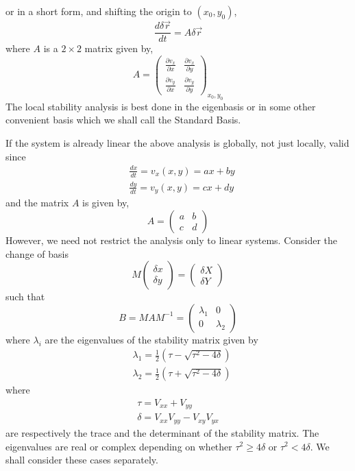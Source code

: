 or in a short form, and shifting the origin to $\left(x_{0}, y_{0}\right)$,
$$
\frac{d \delta \vec{r}}{d t}=A \delta \vec{r}
$$
where $A$ is a $2 \times 2$ matrix given by,
$$
A=\left(\begin{array}{ll}
\frac{\partial v_{x}}{\partial x} & \frac{\partial v_{x}}{\partial y} \\
\frac{\partial v_{y}}{\partial x} & \frac{\partial v_{y}}{\partial y}
\end{array}\right)_{x_{0}, y_{0}}
$$
The local stability analysis is best done in the eigenbasis or in some other convenient basis which we shall call the Standard Basis.

If the system is already linear the above analysis is globally, not just locally, valid since
$$
\begin{aligned}
&\frac{d x}{d t}=v_{x}(x, y)=a x+b y \\
&\frac{d y}{d t}=v_{y}(x, y)=c x+d y
\end{aligned}
$$
and the matrix $A$ is given by,
$$
A=\left(\begin{array}{ll}
a & b \\
c & d
\end{array}\right)
$$
However, we need not restrict the analysis only to linear systems. Consider the change of basis
$$
M\left(\begin{array}{l}
\delta x \\
\delta y
\end{array}\right)=\left(\begin{array}{l}
\delta X \\
\delta Y
\end{array}\right)
$$
such that
$$
B=M A M^{-1}=\left(\begin{array}{cc}
\lambda_{1} & 0 \\
0 & \lambda_{2}
\end{array}\right)
$$
where $\lambda_{i}$ are the eigenvalues of the stability matrix given by
$$
\begin{aligned}
&\lambda_{1}=\frac{1}{2}\left(\tau-\sqrt{\tau^{2}-4 \delta}\right) \\
&\lambda_{2}=\frac{1}{2}\left(\tau+\sqrt{\tau^{2}-4 \delta}\right)
\end{aligned}
$$
where
$$
\begin{gathered}
\tau=V_{x x}+V_{y y} \\
\delta=V_{x x} V_{y y}-V_{x y} V_{y x}
\end{gathered}
$$
are respectively the trace and the determinant of the stability matrix. The eigenvalues are real or complex depending on whether $\tau^{2} \geq 4 \delta$ or $\tau^{2}<4 \delta .$ We shall consider these cases separately.

